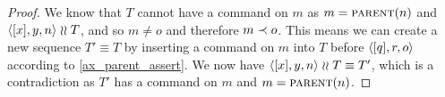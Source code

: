 \begin{proof}
We know that $T$ cannot have a command on $m$ as $m=\text{\normalfont\scshape{parent}}(n)$ and $\langle{[x],y,n}\rangle\mathrel{\wr\wr} T$,
and so $m\neq o$ and therefore $m\prec o$.
This means we can create a new sequence $T'\equiv T$ by inserting a command on 
$m$ into $T$ before $\langle{[q],r,o}\rangle$
according to \cref{ax_parent_assert}.
We now have $\langle{[x],y,n}\rangle\mathrel{\wr\wr} T\equiv T'$, which is a contradiction as
$T'$ has a command on $m$ and $m=\text{\normalfont\scshape{parent}}(n)$.
\end{proof}
